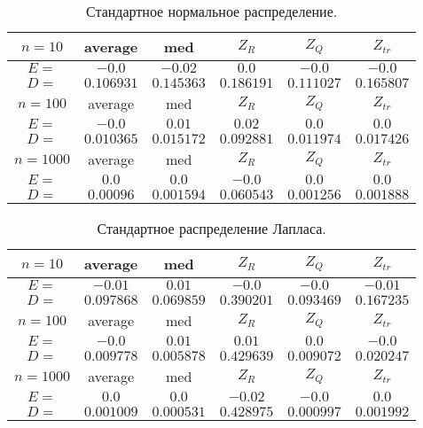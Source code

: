 \documentclass[a4]{article}
\begin{document}
\begin{table}[H]
\caption{\label{tab:normal} Стандартное нормальное распределение.}
\begin{center}
\begin{tabular}{|c|c|c|c|c|c|}
\hline
$n = 10$ & average & med & $Z_R$ & $Z_Q$ & $Z_{tr}$\\
\hline
$E =$ & $-0.0$ & $-0.02$ & $0.0$ & $-0.0$ & $-0.0$ \\
\hline
$D =$ & $0.106931$ & $0.145363$ & $0.186191$ & $0.111027$ & $0.165807$ \\
\hline
$n = 100$ & average & med & $Z_R$ & $Z_Q$ & $Z_{tr}$\\
\hline
$E =$ & $-0.0$ & $0.01$ & $0.02$ & $0.0$ & $0.0$\\
\hline
$D =$ & $0.010365$ &  $0.015172$ &  $0.092881$ &  $0.011974$ &  $0.017426$\\
\hline
$n = 1000$ & average & med & $Z_R$ & $Z_Q$ & $Z_{tr}$\\
\hline
$E =$ & $0.0$ & $0.0$ & $-0.0$ & $0.0$ & $0.0$\\
\hline
$D =$ & $0.00096$ &  $0.001594$ &  $0.060543$ &  $0.001256$ &  $0.001888$\\
\hline
\end{tabular}
\end{center}
\end{table}

\begin{table}[H]
\caption{\label{tab:cauchy} Стандартное распределение Лапласа.}
\begin{center}
\begin{tabular}{|c|c|c|c|c|c|}
\hline
$n = 10$   & average & med & $Z_R$ & $Z_Q$ & $Z_{tr}$\\ \hline
$E =$ & $-0.01$ & $0.01$ &  $-0.0$ &  $-0.0$ &  $-0.01$\\ \hline
$D =$  & $0.097868$ &  $0.069859$ &  $0.390201$ &  $0.093469$ &  $0.167235 $\\    \hline
					
$n = 100$   & average & med & $Z_R$ & $Z_Q$ & $Z_{tr}$\\ \hline
$E =$ &	$-0.0$ &  $0.01$ &  $0.01$ &  $0.0$ &  $-0.0$\\   \hline
$D =$  & $0.009778$ &  $0.005878$ &  $0.429639$ &  $0.009072$ &  $0.020247$\\   \hline 
					
$n = 1000$   & average & med & $Z_R$ & $Z_Q$ & $Z_{tr}$\\ \hline
$E =$ & $0.0$ &  $0.0$ &  $-0.02$ &  $-0.0$ &  $0.0$\\  \hline
$D =$ & $0.001009$ &  $0.000531$ &  $0.428975$ &  $0.000997$ &  $0.001992$\\    
\hline
\end{tabular}
\end{center}
\end{table}
\end{document}
